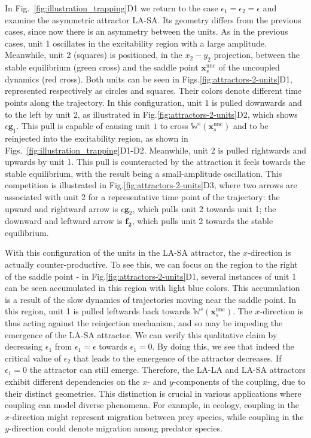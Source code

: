 In Fig.~\ref{fig:illustration_trapping}D1 we return to the case $\epsilon_1=\epsilon_2=\epsilon$ and examine the asymmetric attractor LA-SA. Its geometry differs from the previous cases, since now there is an asymmetry between the units. As in the previous cases, unit 1 oscillates in the excitability region with a large amplitude. Meanwhile, unit 2 (squares) is positioned, in the $x_2-y_2$ projection, between the stable equilibrium (green cross) and the saddle point $\mathbf{x}_s^\mathrm{unc}$ of the uncoupled dynamics (red cross). Both units can be seen in Figs.\ref{fig:attractors-2-units}D1, represented respectively as circles and squares. Their colors denote different time points along the trajectory. In this configuration, unit $1$ is pulled downwards and to the left by unit 2, as illustrated in Fig.\ref{fig:attractors-2-units}D2, which shows $\epsilon \mathbf{g}_1$. This pull is capable of causing unit $1$ to cross $\mathbb{W}^s(\mathbf{x}_s^\mathrm{unc})$ and to be reinjected into the excitability region, as shown in Figs.~\ref{fig:illustration_trapping}D1-D2. Meanwhile, unit 2 is pulled rightwards and upwards by unit 1. This pull is counteracted by the attraction it feels towards the stable equilibrium, with the result being a small-amplitude oscillation. This competition is illustrated in Fig.\ref{fig:attractors-2-units}D3, where two arrows are associated with unit 2 for a representative time point of the trajectory: the upward and rightward arrow is $\epsilon \mathbf{g}_2$, which pulls unit 2 towards unit 1; the downward and leftward arrow is $\mathbf{f_2}$, which pulls unit 2 towards the stable equilibrium. 

With this configuration of the units in the LA-SA attractor, the $x$-direction is actually counter-productive. To see this, we can focus on the region to the right of the saddle point - in Fig.\ref{fig:attractors-2-units}D1, several instances of unit 1 can be seen accumulated in this region with light blue colors. This accumulation is a result of the slow dynamics of trajectories moving near the saddle point. In this region, unit 1 is pulled leftwards back towards $\mathbb{W}^s(\mathbf{x}_s^\mathrm{unc})$. The $x$-direction is thus acting against the reinjection mechanism, and so may be impeding the emergence of the LA-SA attractor. We can verify this qualitative claim by decreasing $\epsilon_1$ from $\epsilon_1=\epsilon$ towards $\epsilon_1 = 0$. By doing this, we see that indeed the critical value of $\epsilon_2$ that leads to the emergence of the attractor decreases. If $\epsilon_1=0$ the attractor can still emerge. Therefore, the LA-LA and LA-SA attractors exhibit different dependencies on the $x$- and $y$-components of the coupling, due to their distinct geometries. This distinction is crucial in various applications where coupling can model diverse phenomena. For example, in ecology, coupling in the $x$-direction might represent migration between prey species, while coupling in the $y$-direction could denote migration among predator species.

